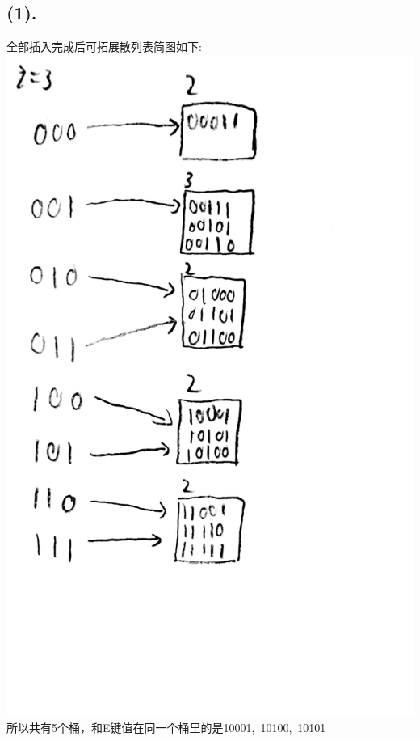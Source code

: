 \documentclass{article}
\begin{document}
	\subsection*{(1).}
	全部插入完成后可拓展散列表简图如下: \\
	\includegraphics[scale=0.15]{8.jpg}\\
	所以共有5个桶，和E键值在同一个桶里的是10001,\ 10100,\ 10101
\end{document}
